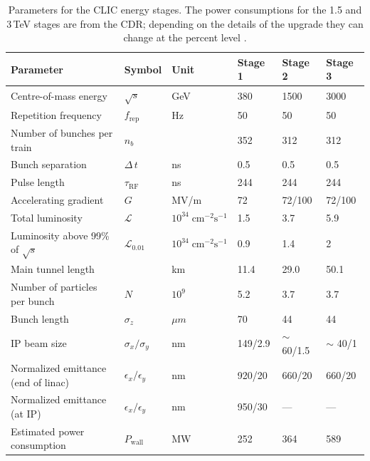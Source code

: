 \begin{table}
\caption[CLIC beam parameters]{Parameters for the CLIC energy stages. The power consumptions for the 1.5 and 3\,TeV stages are from the CDR; depending on the details of the upgrade they can change at the percent level \cite{CLIC:2016zwp}.}
\label{table:clicbeamparameters}
\centering
\begin{tabular}{l l l l l l}
\toprule
\textbf{Parameter}                  & \textbf{Symbol}         & \textbf{Unit}& \textbf{Stage 1} & \textbf{Stage 2} & \textbf{Stage 3} \\
\midrule
Centre-of-mass energy               & $\sqrt{s}$                &GeV                                        & 380 & 1500 & 3000\\
Repetition frequency                & $f_{\text{rep}}$        &Hz                                         & 50 & 50 & 50\\
Number of bunches per train         & $n_{b}$                 &                                           & 352 & 312 & 312\\
Bunch separation                    & $\Delta\,t$             &ns                                         & 0.5 & 0.5 & 0.5\\
Pulse length                        & $\tau_{\text{RF}}$      &ns                                         &244 &244 &244\\
\midrule
Accelerating gradient               & $G$                     &MV/m                                       & 72 & 72/100 & 72/100\\
\midrule
Total luminosity                    & $\mathcal{L}$           &$10^{34}\;\text{cm}^{-2}\text{s}^{-1}$     & 1.5 & 3.7 & 5.9 \\
Luminosity above 99\% of $\sqrt{s}$   & $\mathcal{L}_{0.01}$    &$10^{34}\;\text{cm}^{-2}\text{s}^{-1}$     & 0.9 & 1.4 & 2\\
\midrule
Main tunnel length                  &                         &km                                         & 11.4 & 29.0 & 50.1\\
Number of particles per bunch                    & $N$                     &$10^9$                                     & 5.2 & 3.7 & 3.7\\
Bunch length                        & $\sigma_z$              &$\mu m$                                  & 70 & 44 & 44\\
IP beam size                        & $\sigma_x/\sigma_y$     &nm                                         & 149/2.9 & $\sim$ 60/1.5 & $\sim$ 40/1\\
Normalized emittance (end of linac) & $\epsilon_x/\epsilon_y$ &nm                                         & 920/20 & 660/20 & 660/20\\
Normalized emittance (at IP)        & $\epsilon_x/\epsilon_y$ &nm                                         & 950/30 & ---    &---\\
Estimated power consumption                        & $P_{\text{wall}}$         &MW                                & 252    & 364    & 589\\
\bottomrule
\end{tabular}
\end{table}

